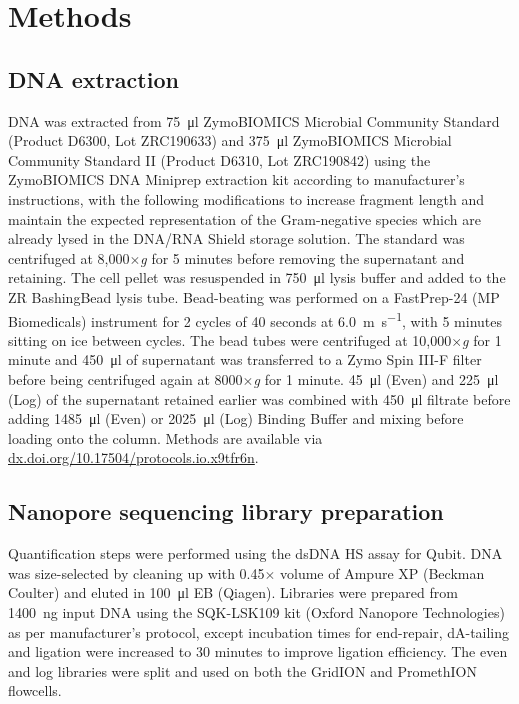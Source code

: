 \documentclass[a4paper,num-refs]{oup-contemporary}
\begin{document}
\section{Methods}

\subsection{DNA extraction}

DNA was extracted from \SI{75}{\micro\litre} ZymoBIOMICS Microbial Community Standard (Product D6300, Lot ZRC190633) and \SI{375}{\micro\litre} ZymoBIOMICS Microbial Community Standard II (Product D6310, Lot ZRC190842) using the ZymoBIOMICS DNA Miniprep extraction kit according to manufacturer's instructions, with the following modifications to increase fragment length and maintain the expected representation of the Gram-negative species which are already lysed in the DNA/RNA Shield storage solution.
The standard was centrifuged at 8,000$\times$\textit{g} for 5 minutes before removing the supernatant and retaining. The cell pellet was resuspended in \SI{750}{\micro\litre} lysis buffer and added to the ZR BashingBead lysis tube. Bead-beating was performed on a FastPrep-24 (MP Biomedicals) instrument for 2 cycles of 40 seconds at \SI{6.0}{\metre\per\second}, with 5 minutes sitting on ice between cycles. The bead tubes were centrifuged at 10,000$\times$\textit{g} for 1 minute and \SI{450}{\micro\litre} of supernatant was transferred to a Zymo Spin III-F filter before being centrifuged again at 8000$\times$\textit{g} for 1 minute.
\SI{45}{\micro\litre} (Even) and \SI{225}{\micro\litre} (Log) of the supernatant retained earlier was combined with \SI{450}{\micro\litre} filtrate before adding \SI{1485}{\micro\litre} (Even) or \SI{2025}{\micro\litre} (Log) Binding Buffer and mixing before loading onto the column.
Methods are available via \url{dx.doi.org/10.17504/protocols.io.x9tfr6n}.

\subsection{Nanopore sequencing library preparation}

Quantification steps were performed using the dsDNA HS assay for Qubit. 
DNA was size-selected by cleaning up with 0.45$\times$ volume of Ampure XP (Beckman Coulter) and eluted in \SI{100}{\micro\litre} EB (Qiagen). Libraries were prepared from \SI{1400}{\nano\gram} input DNA using the SQK-LSK109 kit (Oxford Nanopore Technologies) as per manufacturer's protocol, except incubation times for end-repair, dA-tailing and ligation were increased to 30 minutes to improve ligation efficiency. The even and log libraries were split and used on both the GridION and PromethION flowcells.
\end{document}
